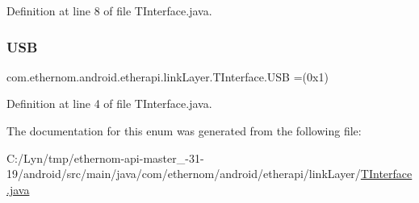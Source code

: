 Definition at line 8 of file T\+Interface.\+java.

\mbox{\label{enumcom_1_1ethernom_1_1android_1_1etherapi_1_1link_layer_1_1_t_interface_a2297eb79567b413c6a2de512ce053492}} 
\subsubsection{\texorpdfstring{U\+SB}{USB}}
{\footnotesize\ttfamily com.\+ethernom.\+android.\+etherapi.\+link\+Layer.\+T\+Interface.\+U\+SB =(0x1)}



Definition at line 4 of file T\+Interface.\+java.



The documentation for this enum was generated from the following file\+:\begin{DoxyCompactItemize}
\item 
C\+:/\+Lyn/tmp/ethernom-\/api-\/master\+\_-\/31-\/19/android/src/main/java/com/ethernom/android/etherapi/link\+Layer/\mbox{\hyperlink{_t_interface_8java}{T\+Interface.\+java}}\end{DoxyCompactItemize}
